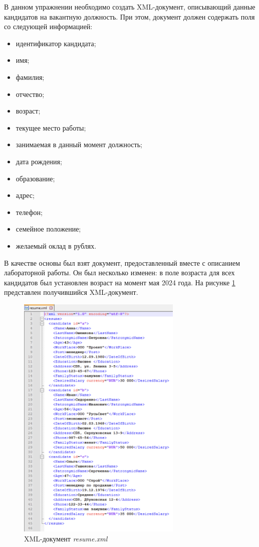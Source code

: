 \documentclass[a4paper, 14pt]{extarticle}
\begin{document}
В данном упражнении необходимо создать XML-документ, описывающий данные
кандидатов на вакантную должность. При этом, документ должен содержать поля со
следующей информацией:
\begin{itemize}
  \item идентификатор кандидата;
  \item имя;
  \item фамилия;
  \item отчество;
  \item возраст;
  \item текущее место работы;
  \item занимаемая в данный момент должность;
  \item дата рождения;
  \item образование;
  \item адрес;
  \item телефон;
  \item семейное положение;
  \item желаемый оклад в рублях.
\end{itemize}

В качестве основы был взят документ, предоставленный вместе с описанием
лабораторной работы. Он был несколько изменен: в поле возраста для всех
кандидатов был установлен возраст на момент мая 2024 года. На рисунке
\ref{fig:task-1:1} представлен получившийся XML-документ.

\begin{figure}[H]
  \centering
  \includegraphics[width=0.7\textwidth]{images/task-1/1.png}
  \caption{XML-документ \textit{\foreignlanguage{english}{resume.xml}}}
  \label{fig:task-1:1}
\end{figure}
\end{document}
